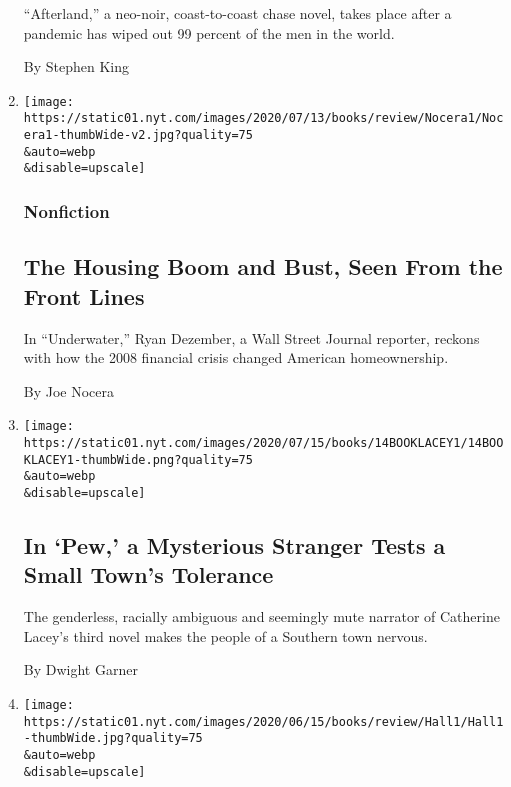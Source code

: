 \begin{enumerate}
  ``Afterland,'' a neo-noir, coast-to-coast chase novel, takes place
  after a pandemic has wiped out 99 percent of the men in the world.

  By Stephen King
\item
  \href{/2020/07/14/books/review/underwater-ryan-dezember.html}{}

  \texttt{[image: https://static01.nyt.com/images/2020/07/13/books/review/Nocera1/Nocera1-thumbWide-v2.jpg?quality=75\\\&auto=webp\\\&disable=upscale]}

  \hypertarget{nonfiction-2}{%
  \subsubsection{Nonfiction}\label{nonfiction-2}}

  \hypertarget{the-housing-boom-and-bust-seen-from-the-front-lines}{%
  \subsection{The Housing Boom and Bust, Seen From the Front
  Lines}\label{the-housing-boom-and-bust-seen-from-the-front-lines}}

  In ``Underwater,'' Ryan Dezember, a Wall Street Journal reporter,
  reckons with how the 2008 financial crisis changed American
  homeownership.

  By Joe Nocera
\item
  \href{/2020/07/13/books/review-pew-catherine-lacey.html}{}

  \texttt{[image: https://static01.nyt.com/images/2020/07/15/books/14BOOKLACEY1/14BOOKLACEY1-thumbWide.png?quality=75\\\&auto=webp\\\&disable=upscale]}

  \hypertarget{in-pew-a-mysterious-stranger-tests-a-small-towns-tolerance}{%
  \subsection{In `Pew,' a Mysterious Stranger Tests a Small Town's
  Tolerance}\label{in-pew-a-mysterious-stranger-tests-a-small-towns-tolerance}}

  The genderless, racially ambiguous and seemingly mute narrator of
  Catherine Lacey's third novel makes the people of a Southern town
  nervous.

  By Dwight Garner
\item
  \href{/2020/07/10/books/review/big-friendship-aminatou-sow-ann-friedman.html}{}

  \texttt{[image: https://static01.nyt.com/images/2020/06/15/books/review/Hall1/Hall1-thumbWide.jpg?quality=75\\\&auto=webp\\\&disable=upscale]}


\end{enumerate}
